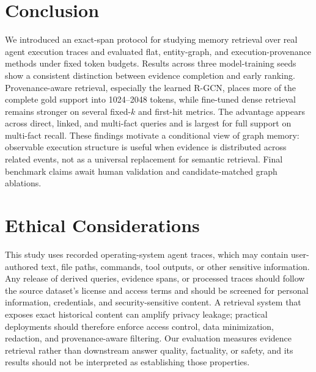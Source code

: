 \documentclass[sigconf,anonymous,review]{acmart}
\begin{document}
\section{Conclusion}

We introduced an exact-span protocol for studying memory retrieval over real agent execution traces and evaluated flat, entity-graph, and execution-provenance methods under fixed token budgets. Results across three model-training seeds show a consistent distinction between evidence completion and early ranking. Provenance-aware retrieval, especially the learned R-GCN, places more of the complete gold support into 1024--2048 tokens, while fine-tuned dense retrieval remains stronger on several fixed-$k$ and first-hit metrics. The advantage appears across direct, linked, and multi-fact queries and is largest for full support on multi-fact recall. These findings motivate a conditional view of graph memory: observable execution structure is useful when evidence is distributed across related events, not as a universal replacement for semantic retrieval. Final benchmark claims await human validation and candidate-matched graph ablations.

\section{Ethical Considerations}
This study uses recorded operating-system agent traces, which may contain user-authored text, file paths, commands, tool outputs, or other sensitive information. Any release of derived queries, evidence spans, or processed traces should follow the source dataset's license and access terms and should be screened for personal information, credentials, and security-sensitive content. A retrieval system that exposes exact historical content can amplify privacy leakage; practical deployments should therefore enforce access control, data minimization, redaction, and provenance-aware filtering. Our evaluation measures evidence retrieval rather than downstream answer quality, factuality, or safety, and its results should not be interpreted as establishing those properties.



\end{document}
